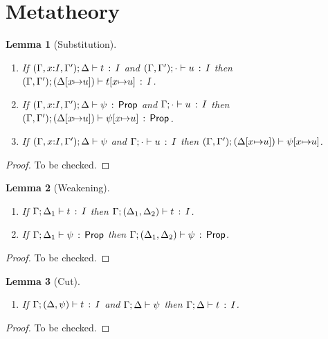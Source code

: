 \documentclass[11pt]{article}
\newtheorem{lemma}{Lemma}
\begin{document}
\clearpage

\section{Metatheory}

\begin{lemma}[Substitution]
\label{lemma:subst}
\mbox{}
 \begin{enumerate}
	\item If $(\Gamma,x{:}I,\Gamma');\Delta \vdash t\, :\, I$ and
	  $(\Gamma,\Gamma');\cdot \vdash u\, :\, I$ then
	  $(\Gamma,\Gamma');(\Delta[x{\mapsto}u]) \vdash t[x{\mapsto}u]\, :\, I$.
	\item If $(\Gamma,x{:}I,\Gamma');\Delta \vdash \psi\, :\, \mathsf{Prop}$ and
	  $\Gamma;\cdot \vdash u\, :\, I$ then
	  $(\Gamma,\Gamma');(\Delta[x{\mapsto}u]) \vdash \psi[x{\mapsto}u]\, :\, \mathsf{Prop}$.
	\item If $(\Gamma,x{:}I,\Gamma');\Delta \vdash \psi$ and
	  $\Gamma;\cdot \vdash u\, :\, I$ then
	  $(\Gamma,\Gamma');(\Delta[x{\mapsto}u]) \vdash \psi[x{\mapsto}u]$.	
 \end{enumerate}
\end{lemma}

\begin{proof}
To be checked.
\end{proof}

\begin{lemma}[Weakening]
\mbox{}
\label{lemma:weaken}
\begin{enumerate}
	\item If $\Gamma;\Delta_1 \vdash t\, :\, I$ then
	   $\Gamma;(\Delta_1,\Delta_2) \vdash t\, :\, I$.
	\item If $\Gamma;\Delta_1 \vdash \psi\, :\, \mathsf{Prop}$ then
	   $\Gamma;(\Delta_1,\Delta_2) \vdash \psi\, :\, \mathsf{Prop}$.
\end{enumerate}
\end{lemma}

\begin{proof}
To be checked.
\end{proof}

\begin{lemma}[Cut]
\label{lemma:cut}
\mbox{}
\begin{enumerate}
  \item If $\Gamma;(\Delta,\psi) \vdash t\, :\, I$ and
     $\Gamma;\Delta \vdash \psi$ then
     $\Gamma;\Delta \vdash t\, :\, I$.
\end{enumerate}
\end{lemma}

\begin{proof}
To be checked.
\end{proof}
\end{document}
